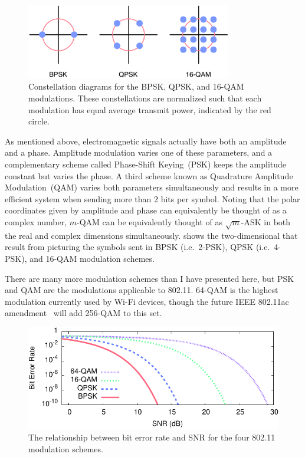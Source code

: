 \begin{figure}[t]
\centering
\includegraphics[width=0.8\textwidth]{figures/constellations_radius}
\caption{\label{fig:constellations}Constellation diagrams for the BPSK, QPSK, and 16-QAM modulations. These constellations are normalized such that each modulation has equal average transmit power, indicated by the red circle.}
\end{figure}

As mentioned above, electromagnetic signals actually have both an amplitude and a phase. Amplitude modulation varies one of these parameters, and a complementary scheme called Phase-Shift Keying~(PSK) keeps the amplitude constant but varies the phase. A third scheme known as Quadrature Amplitude Modulation~(QAM) varies both parameters simultaneously and results in a more efficient system when sending more than 2 bits per symbol. Noting that the polar coordinates given by amplitude and phase can equivalently be thought of as a complex number, $m$-QAM can be equivalently thought of as $\sqrt{m}$-ASK in both the real and complex dimensions simultaneously.  shows the two-dimensional  that result from picturing the symbols sent in BPSK (i.e.\ 2-PSK), QPSK (i.e.\ 4-PSK), and 16-QAM modulation schemes.

There are many more modulation schemes than I have presented here, but PSK and QAM are the modulations applicable to 802.11.
64-QAM is the highest modulation currently used by Wi-Fi devices, though the future IEEE 802.11ac amendment~\cite{80211ac} will add 256-QAM to this set.

\begin{figure}[ht]
\centering
\includegraphics{calculations/snr_ber-crop}
\caption{\label{fig:mod_ber_snr}The relationship between bit error rate and SNR for the four 802.11 modulation schemes.}
\end{figure}

